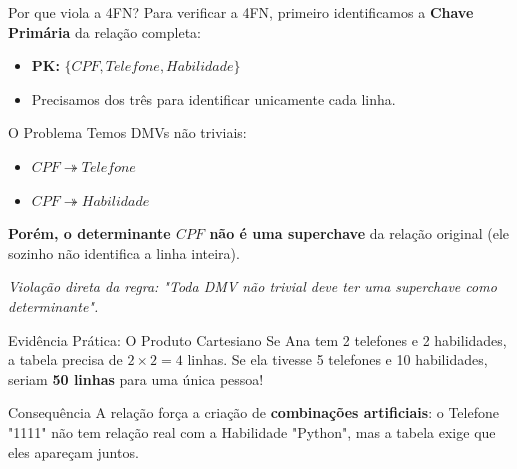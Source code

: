 \documentclass[9pt]{beamer}
\begin{document}
\begin{frame}{Por que viola a 4FN?}
  \small
  Para verificar a 4FN, primeiro identificamos a \textbf{Chave Primária} da relação completa:
  \vspace{0.2cm}
  \begin{itemize}
    \item \textbf{PK:} $\{CPF, Telefone, Habilidade\}$
    \item Precisamos dos três para identificar unicamente cada linha.
  \end{itemize}
  \vspace{0.4cm}
  \begin{alertblock}{O Problema}
    Temos DMVs não triviais:
    \begin{itemize}
      \item $CPF \twoheadrightarrow Telefone$
      \item $CPF \twoheadrightarrow Habilidade$
    \end{itemize}
    \textbf{Porém, o determinante $CPF$ não é uma superchave} da relação original (ele sozinho não identifica a linha inteira).
  \end{alertblock}
  \vspace{0.2cm}
  \textit{Violação direta da regra: "Toda DMV não trivial deve ter uma superchave como determinante".}
\end{frame}

\begin{frame}{Evidência Prática: O Produto Cartesiano}
  \small
  Se Ana tem 2 telefones e 2 habilidades, a tabela precisa de $2 \times 2 = 4$ linhas.
  Se ela tivesse 5 telefones e 10 habilidades, seriam \textbf{50 linhas} para uma única pessoa!
  \vspace{0.3cm}
  \centering
  \vspace{0.3cm}
  \begin{alertblock}{Consequência}
    A relação força a criação de \textbf{combinações artificiais}: o Telefone "1111" não tem relação real com a Habilidade "Python", mas a tabela exige que eles apareçam juntos.
  \end{alertblock}
\end{frame}
\end{document}
